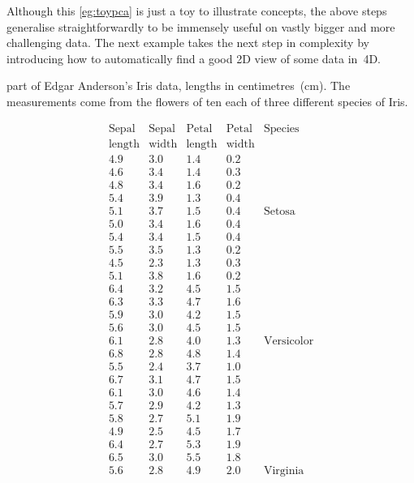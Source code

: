 Although this \autoref{eg:toypca} is just a toy to illustrate concepts, the above steps generalise straightforwardly to be immensely useful on vastly bigger and more challenging data.
The next example takes the next step in complexity by introducing how to automatically find a good 2D view of some data in~4D.





\begin{example} \label{eg:eaid}
\begin{table}
\caption{part of Edgar Anderson's Iris data, lengths in centimetres~(cm).  
The measurements come from the flowers of ten each of three different species of Iris.}
\label{tbl:eaid}
\begin{equation*}
\begin{array}{rrrrl}
\hline
\text{Sepal}&\text{Sepal}&\text{Petal}&\text{Petal}&\text{Species}
\\\text{length}&\text{width}&\text{length}&\text{width}&
\\\hline
  4.9&3.0&1.4&0.2&
\\4.6&3.4&1.4&0.3&
\\4.8&3.4&1.6&0.2&
\\5.4&3.9&1.3&0.4&
\\5.1&3.7&1.5&0.4&\text{Setosa}
\\5.0&3.4&1.6&0.4&
\\5.4&3.4&1.5&0.4&
\\5.5&3.5&1.3&0.2&
\\4.5&2.3&1.3&0.3&
\\5.1&3.8&1.6&0.2&
\\\hline
  6.4&3.2&4.5&1.5&
\\6.3&3.3&4.7&1.6&
\\5.9&3.0&4.2&1.5&
\\5.6&3.0&4.5&1.5&
\\6.1&2.8&4.0&1.3&\text{Versicolor}
\\6.8&2.8&4.8&1.4&
\\5.5&2.4&3.7&1.0&
\\6.7&3.1&4.7&1.5&
\\6.1&3.0&4.6&1.4&
\\5.7&2.9&4.2&1.3&
\\\hline
  5.8&2.7&5.1&1.9&
\\4.9&2.5&4.5&1.7&
\\6.4&2.7&5.3&1.9&
\\6.5&3.0&5.5&1.8&
\\5.6&2.8&4.9&2.0&\text{Virginia}

\end{array}
\end{equation*}
\end{table}
\end{example}
